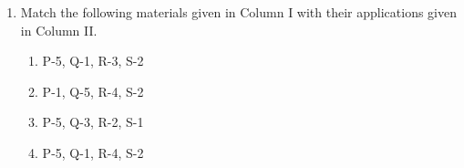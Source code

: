 \documentclass[journal,9pt,onecolumn]{IEEEtran}
\begin{document}
\begin{enumerate}
\item Match the following materials given in Column I with their applications given in Column II.
\begin{table}[h!]
 	\centering
 	
 	\label{tab:Ph-2009}
\end{table}
\begin{multicols}{4}
\begin{enumerate}
    \item P-5, Q-1, R-3, S-2
    \item P-1, Q-5, R-4, S-2
    \item P-5, Q-3, R-2, S-1
    \item P-5, Q-1, R-4, S-2
\end{enumerate}
\end{multicols}

\end{enumerate}
\end{document}
